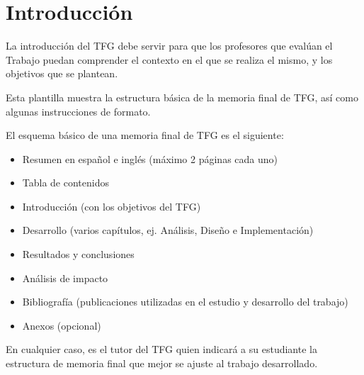 \chapter*{Introducción}
\label{ch:intro}

La introducción del TFG debe servir para que los profesores que evalúan el Trabajo puedan comprender el contexto en el que se realiza el mismo, y los objetivos que se plantean.

Esta plantilla muestra la estructura básica de la memoria final de TFG, así como algunas instrucciones de formato.

El esquema básico de una memoria final de TFG es el siguiente:
\begin{itemize}
\item Resumen en español e inglés (máximo 2 páginas cada uno)
\item Tabla de contenidos
\item Introducción (con los objetivos del TFG)
\item Desarrollo (varios capítulos, ej. Análisis, Diseño e Implementación)
\item Resultados y conclusiones
\item Análisis de impacto
\item Bibliografía (publicaciones utilizadas en el estudio y desarrollo del trabajo)
\item Anexos (opcional)
\end{itemize}

En cualquier caso, es el tutor del TFG quien indicará a su estudiante la estructura de memoria final que mejor se ajuste al trabajo desarrollado.

